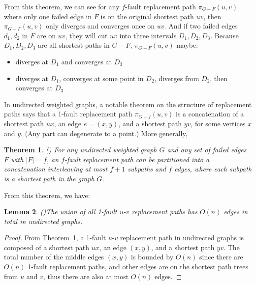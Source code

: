 \documentclass[11pt]{article}
\theoremstyle{plain}
\newtheorem{theorem}{Theorem}[section]
\newtheorem{lemma}[theorem]{Lemma}
\theoremstyle{definition}
\newcommand{\og}[3]{\pi_{G-#3}\left(#1,#2\right)}
\begin{document}
From this theorem, we can see for any $f$-fault replacement path $\og{u}{v}{F}$ where only one failed edge in $F$ is on the original shortest path $uv$, then $\og{u}{v}{F}$ only diverges and converges once on $uv$. And if two failed edges $d_1,d_2$ in $F$ are on $uv$, they will cut $uv$ into three intervals $D_1,D_2,D_3$. Because $D_1,D_2,D_3$ are all shortest paths in $G-F$, $\og{u}{v}{F}$ maybe:
\begin{itemize}
    \item diverges at $D_1$ and converges at $D_3$
    \item diverges at $D_1$, converges at some point in $D_2$, diverges from $D_2$, then converges at $D_3$
\end{itemize}






In undirected weighted graphs, a notable theorem on the structure of replacement paths says that a 1-fault replacement path $\og{u}{v}{f}$ is a concatenation of a shortest path $ux$, an edge $e=(x,y)$, and a shortest path $yv$, for some vertices $x$ and $y.$ (Any part can degenerate to a point.) More generally,

\begin{theorem} (\cite{2001Restoration}) \label{ReplacementPath}
For any undirected weighted graph $G$ and any set of failed edges $F$ with $|F|=f$, an $f$-fault replacement path can be partitioned into a concatenation interleaving at most $f+1$ subpaths and $f$ edges, where each subpath is a shortest path in the graph $G$. 
\end{theorem}

From this theorem, we have:
\begin{lemma}(\cite{BodwinGPW17})\label{thm:n-edges}
    The union of all 1-fault $u$-$v$ replacement paths has $O(n)$ edges in total in undirected graphs.
\end{lemma}
\begin{proof}
    From Theorem~\ref{ReplacementPath}, a 1-fault $u$-$v$ replacement path in undirected graphs is composed of a shortest path $ux$, an edge $(x,y)$, and a shortest path $yv$. The total number of the middle edges $(x,y)$ is bounded by $O(n)$ since there are $O(n)$ 1-fault replacement paths, and other edges are on the shortest path trees from $u$ and $v$, thus there are also at most $O(n)$ edges.
    
\end{proof}
\end{document}
